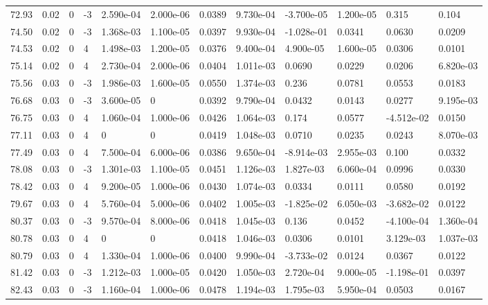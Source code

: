 \documentclass[preview]{standalone}
\begin{document}
{{{{{\begin{tabular}{L{1.2cm}C{1.2cm} C{0.3cm}C{0.5cm} C{1.4cm}C{1.4cm} C{1.4cm}C{1.4cm} C{1.6cm}C{1.6cm} C{1.6cm}C{1.6cm}}
  72.93  &  0.02  & 0     & -3 &  2.590e-04  & 2.000e-06  &  0.0389&   9.730e-04& -3.700e-05 & 1.200e-05   &  0.315 & 0.104  \\ 
  74.50  &  0.02  & 0     & -3 &  1.368e-03  & 1.100e-05  &  0.0397&   9.930e-04& -1.028e-01 & 0.0341   &  0.0630 & 0.0209  \\ 
  74.53  &  0.02  & 0     &  4 &  1.498e-03  & 1.200e-05  &  0.0376&   9.400e-04& 4.900e-05 & 1.600e-05   &  0.0306 & 0.0101  \\ 
  75.14  &  0.02  & 0     &  4 &  2.730e-04  & 2.000e-06  &  0.0404&   1.011e-03& 0.0690 & 0.0229   &  0.0206 & 6.820e-03  \\ 
  75.56  &  0.03  & 0     & -3 &  1.986e-03  & 1.600e-05  &  0.0550&   1.374e-03& 0.236 & 0.0781   &  0.0553 & 0.0183  \\ 
  76.68  &  0.03  & 0     & -3 &  3.600e-05  & 0  &  0.0392&   9.790e-04& 0.0432 & 0.0143   &  0.0277 & 9.195e-03  \\ 
  76.75  &  0.03  & 0     &  4 &  1.060e-04  & 1.000e-06  &  0.0426&   1.064e-03& 0.174 & 0.0577   &  -4.512e-02 & 0.0150  \\ 
  77.11  &  0.03  & 0     &  4 &  0  & 0  &  0.0419&   1.048e-03& 0.0710 & 0.0235   &  0.0243 & 8.070e-03  \\ 
  77.49  &  0.03  & 0     &  4 &  7.500e-04  & 6.000e-06  &  0.0386&   9.650e-04& -8.914e-03 & 2.955e-03   &  0.100 & 0.0332  \\ 
  78.08  &  0.03  & 0     & -3 &  1.301e-03  & 1.100e-05  &  0.0451&   1.126e-03& 1.827e-03 & 6.060e-04   &  0.0996 & 0.0330  \\ 
  78.42  &  0.03  & 0     &  4 &  9.200e-05  & 1.000e-06  &  0.0430&   1.074e-03& 0.0334 & 0.0111   &  0.0580 & 0.0192  \\ 
  79.67  &  0.03  & 0     &  4 &  5.760e-04  & 5.000e-06  &  0.0402&   1.005e-03& -1.825e-02 & 6.050e-03   &  -3.682e-02 & 0.0122  \\ 
  80.37  &  0.03  & 0     & -3 &  9.570e-04  & 8.000e-06  &  0.0418&   1.045e-03& 0.136 & 0.0452   &  -4.100e-04 & 1.360e-04  \\ 
  80.78  &  0.03  & 0     &  4 &  0  & 0  &  0.0418&   1.046e-03& 0.0306 & 0.0101   &  3.129e-03 & 1.037e-03  \\ 
  80.79  &  0.03  & 0     &  4 &  1.330e-04  & 1.000e-06  &  0.0400&   9.990e-04& -3.733e-02 & 0.0124   &  0.0367 & 0.0122  \\ 
  81.42  &  0.03  & 0     & -3 &  1.212e-03  & 1.000e-05  &  0.0420&   1.050e-03& 2.720e-04 & 9.000e-05   &  -1.198e-01 & 0.0397  \\ 
  82.43  &  0.03  & 0     & -3 &  1.160e-04  & 1.000e-06  &  0.0478&   1.194e-03& 1.795e-03 & 5.950e-04   &  0.0503 & 0.0167  \\ 
\hline 
\end{tabular} 

}}}}}
\end{document}
